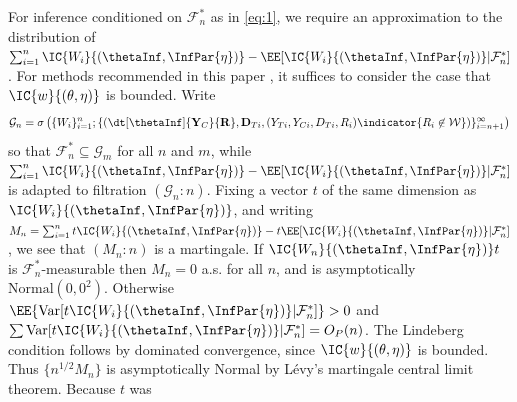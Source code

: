\sloppy
For inference conditioned on $\mathcal{F}_{n}^{*}$ as in \eqref{eq:1},
we require an approximation to the distribution of $\sum_{i=1}^{n} \IC{W_{i}}{(\thetaInf,
    \InfPar{\eta})} - \EE[  \IC{W_{i}}{(\thetaInf,
    \InfPar{\eta})} \vert  \mathcal{F}_{n}^{*} ]$.    For methods
  recommended in this paper%
,  it suffices to consider the
  case that $\IC{w}{(\theta,\eta)}$ is bounded.
Write
\begin{equation*}
\mathcal{G}_{n}  = \sigma\left(  \{W_{i}\}_{i=1}^{n};
\{\left(\dt[\thetaInf]{\mathbf{Y}_{C}}{
    \mathbf{R}},
\mathbf{D}_{Ti},  (Y_{Ti},
Y_{Ci}, D_{Ti}, R_{i})\indicator{{R}_{i} \not\in
  \mathcal{W}}\right)\}_{i=n+1}^{\infty}
  \right)
\end{equation*}
so that  $\mathcal{F}_{n}^{*} \subseteq \mathcal{G}_{m}$ for all $n$
and $m$, while $\sum_{i=1}^{n} \IC{W_{i}}{(\thetaInf,
    \InfPar{\eta})} - \EE[  \IC{W_{i}}{(\thetaInf,
    \InfPar{\eta})} \vert  \mathcal{F}_{n}^{*} ]$ is adapted to
  filtration $(\mathcal{G}_{n}: n)$.
Fixing a vector $t$ of the same dimension as $\IC{W_{i}}{(\thetaInf,
  \InfPar{\eta})}$, and writing $M_{n} = \sum_{i=1}^{n} t\IC{W_{i}}{(\thetaInf,
    \InfPar{\eta})} - t  \EE[  \IC{W_{i}}{(\thetaInf,
    \InfPar{\eta})} \vert  \mathcal{F}_{n}^{*} ]$, we see that
  $(M_{n} : n)$ is a martingale. If $\IC{W_{n}}{(\thetaInf,
    \InfPar{\eta})}t$ is $\mathcal{F}_{n}^{*}$-measurable then $M_{n}=0$
  a.s. for all $n$, and is asymptotically $\mathrm{Normal}(0,0^2)$.
Otherwise
  $\EE\{\mathrm{Var}[ t \IC{W_{i}}{(\thetaInf,
    \InfPar{\eta})} \vert \mathcal{F}_{n}^{*}]\} >0$ and $\sum \mathrm{Var}[t   \IC{W_{i}}{(\thetaInf,
    \InfPar{\eta})} \vert \mathcal{F}_{n}^{*}] = O_{P}(n)$.
The Lindeberg condition follows by dominated convergence,
since $\IC{w}{(\theta,\eta)}$ is bounded.
Thus $\{n^{1/2}M_{n}\}$ is asymptotically Normal by L{\'e}vy's
martingale central limit theorem.  Because $t$ was
